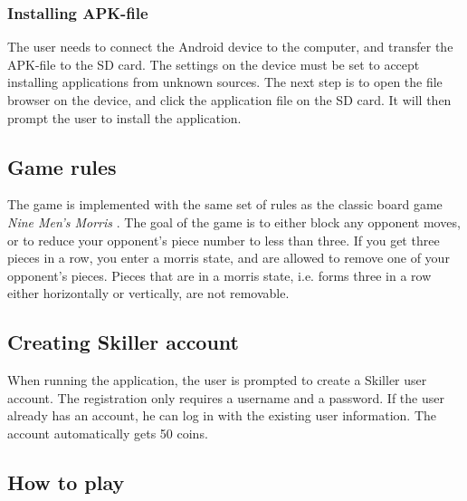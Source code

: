 \subsubsection{Installing APK-file}
The user needs to connect the Android device to the computer, and transfer the APK-file to the SD card. The settings on the device must be set to accept installing applications from unknown sources. The next step is to open the file browser on the device, and click the application file on the SD card. It will then prompt the user to install the application.

\subsection{Game rules}
The game is implemented with the same set of rules as the classic board game \emph{Nine Men's Morris} \cite{morris}. The goal of the game is to either block any opponent moves, or to reduce your opponent's piece number to less than three. If you get three pieces in a row, you enter a morris state, and are allowed to remove one of your opponent's pieces. Pieces that are in a morris state, i.e. forms three in a row either horizontally or vertically, are not removable.

\subsection{Creating Skiller account}
When running the application, the user is prompted to create a Skiller user account. The registration only requires a username and a password. If the user already has an account, he can log in with the existing user information. The account automatically gets 50 coins.

\subsection{How to play}
\label{section:playing}

